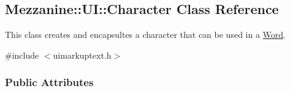 \hypertarget{structMezzanine_1_1UI_1_1Character}{
\subsection{Mezzanine::UI::Character Class Reference}
\label{structMezzanine_1_1UI_1_1Character}
}


This class creates and encapsultes a character that can be used in a \hyperlink{classMezzanine_1_1UI_1_1Word}{Word}.  




{\ttfamily \#include $<$uimarkuptext.h$>$}

\subsubsection*{Public Attributes}

